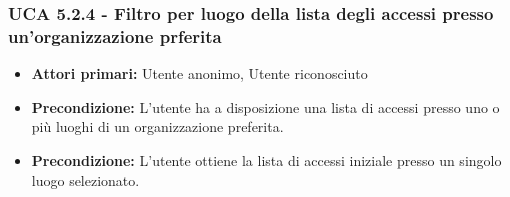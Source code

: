 \subsubsection{UCA 5.2.4 - Filtro per luogo della lista degli accessi presso un'organizzazione prferita}
\begin{itemize}
    \item \textbf{Attori primari:} Utente anonimo, Utente riconosciuto
    \item \textbf{Precondizione:} L'utente ha a disposizione una lista di accessi presso uno o più luoghi di un organizzazione preferita.
    \item \textbf{Precondizione:} L'utente ottiene la lista di accessi iniziale presso un singolo luogo selezionato.
\end{itemize}